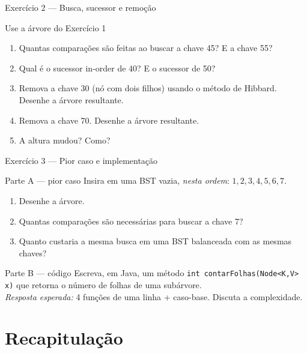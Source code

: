 \documentclass[aspectratio=169]{beamer}
\begin{document}
\begin{frame}[shrink=20]{Exercício 2 --- Busca, sucessor e remoção}
\begin{block}{Use a árvore do Exercício 1}
\begin{enumerate}
  \item Quantas comparações são feitas ao buscar a chave 45? E a chave 55?
  \item Qual é o sucessor in-order de 40? E o sucessor de 50?
  \item Remova a chave 30 (nó com dois filhos) usando o método de Hibbard. Desenhe a árvore resultante.
  \item Remova a chave 70. Desenhe a árvore resultante.
  \item A altura mudou? Como?
\end{enumerate}
\end{block}
\end{frame}

\begin{frame}{Exercício 3 --- Pior caso e implementação}
\begin{block}{Parte A --- pior caso}
Insira em uma BST vazia, \emph{nesta ordem}: $1, 2, 3, 4, 5, 6, 7$.
\begin{enumerate}
  \item Desenhe a árvore.
  \item Quantas comparações são necessárias para buscar a chave 7?
  \item Quanto custaria a mesma busca em uma BST balanceada com as mesmas chaves?
\end{enumerate}
\end{block}
\begin{block}{Parte B --- código}
Escreva, em Java, um método \texttt{int contarFolhas(Node<K,V> x)} que retorna o número de folhas de uma subárvore.\\
\emph{Resposta esperada:} 4 funções de uma linha + caso-base. Discuta a complexidade.
\end{block}
\end{frame}

\section{Recapitulação}
\end{document}
